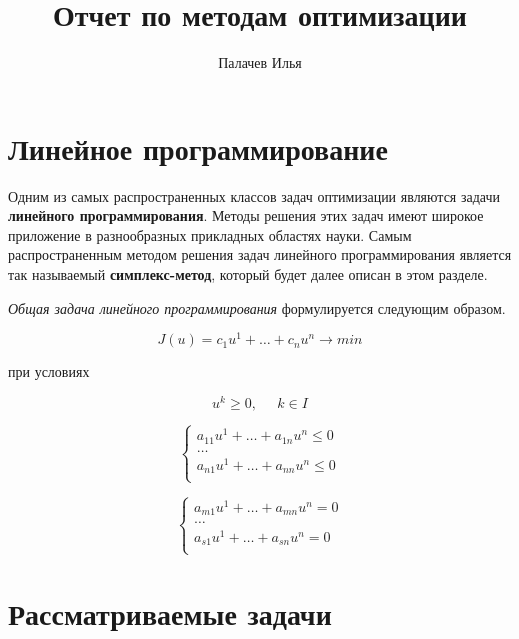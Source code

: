 \documentclass[a4paper, 12pt, titlepage]{article}
\title{Отчет по методам оптимизации}
\author{Палачев Илья}
\theoremstyle{definition}
\theoremstyle{plain}
\theoremstyle{plain}
\begin{document}
\maketitle

\tableofcontents

\newpage
\section{Линейное программирование}
Одним из самых распространенных классов задач оптимизации являются задачи
\textbf{линейного программирования}. Методы решения этих задач имеют широкое
приложение в разнообразных прикладных областях науки. Самым распространенным
методом решения задач линейного программирования является так называемый
\textbf{симплекс-метод}, который будет далее описан в этом разделе.

\textit{Общая задача линейного программирования} формулируется следующим
образом.

\begin{equation}
 J(u) = c_{1} u^{1} + \ldots + c_{n} u^{n} \to min
\end{equation}

при условиях

\begin{equation}
 u^{k} \geq 0, \;\;\;\;\; k \in I
\end{equation}

\begin{equation}
 \left\{
  \begin{aligned}
   a_{11} u^{1} + \ldots + a_{1n} u^{n} \leq 0 \\
   \ldots \\
   a_{n1} u^{1} + \ldots + a_{nn} u^{n} \leq 0 \\
  \end{aligned}
 \right.
\end{equation}

\begin{equation}
 \left\{
  \begin{aligned}
   a_{m1} u^{1} + \ldots + a_{mn} u^{n} = 0 \\
   \ldots \\
   a_{s1} u^{1} + \ldots + a_{sn} u^{n} = 0 \\
  \end{aligned}
 \right.
\end{equation}


\section{Рассматриваемые задачи}
\label{sec:problem}
\end{document}
